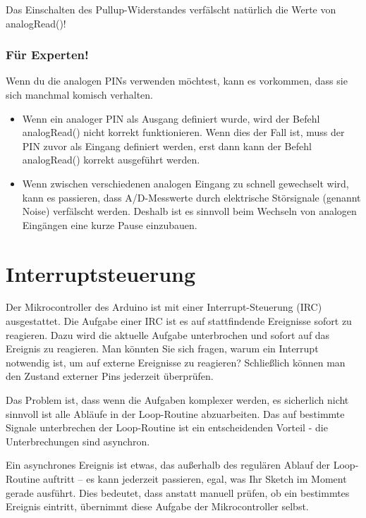 Das Einschalten des Pullup-Widerstandes verfälscht natürlich die Werte von analogRead()!

\subsubsection{Für Experten!} 

Wenn du die analogen PINs verwenden möchtest, kann es vorkommen, dass sie sich manchmal komisch verhalten.
\begin{itemize}
  \item Wenn ein analoger PIN als Ausgang definiert wurde, wird der Befehl analogRead() nicht korrekt funktionieren. Wenn dies der Fall ist, muss der PIN zuvor als Eingang definiert werden, erst dann kann der Befehl analogRead() korrekt ausgeführt werden. 
 \item  Wenn zwischen verschiedenen analogen Eingang zu schnell gewechselt wird, kann es passieren, dass  A/D-Messwerte durch elektrische Störsignale (genannt Noise) verfälscht werden. Deshalb ist es sinnvoll beim Wechseln von analogen Eingängen eine kurze Pause einzubauen.
\end{itemize}





\section{Interruptsteuerung}
 
Der Mikrocontroller des Arduino ist mit einer Interrupt-Steuerung (IRC) ausgestattet. Die Aufgabe einer IRC ist es auf stattfindende Ereignisse sofort zu reagieren. Dazu wird die aktuelle Aufgabe unterbrochen und sofort auf das Ereignis zu reagieren.
Man könnten Sie sich fragen, warum ein Interrupt notwendig ist,  um auf externe Ereignisse zu reagieren?
Schließlich können man den Zustand  externer Pins jederzeit überprüfen.

Das Problem ist, dass wenn die Aufgaben komplexer werden, es sicherlich nicht sinnvoll ist alle Abläufe 
in der Loop-Routine abzuarbeiten. Das auf bestimmte Signale unterbrechen der Loop-Routine ist ein
entscheidenden Vorteil - die Unterbrechungen  sind asynchron. 

Ein asynchrones Ereignis ist etwas, das außerhalb des regulären Ablauf der Loop-Routine auftritt -- es
kann jederzeit passieren, egal, was Ihr Sketch im Moment gerade ausführt. Dies bedeutet, dass anstatt 
manuell prüfen, ob ein bestimmtes  Ereignis eintritt, übernimmt diese Aufgabe der Mikrocontroller selbst.

